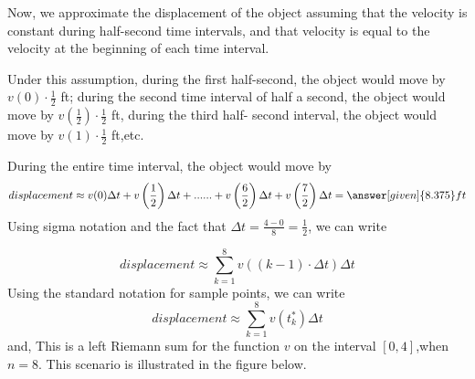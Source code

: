 \documentclass{ximera}
\begin{document}
\begin{example}
\begin{explanation}
\begin{image}
\end{image}
Now, we approximate the displacement of the object assuming that the velocity is constant during half-second time intervals, and that velocity is equal to the velocity at the beginning of each time interval.


 Under this assumption,  during the first half-second, the object would move by $v(0)\cdot\frac{1}{2}$ ft;  during the second time interval of half a  second, the object would move by $v\left(\frac{1}{2}\right)\cdot\frac{1}{2}$ ft, during the third half- second interval, the object would move by $v(1)\cdot\frac{1}{2}$ ft,etc. 
 
 
 During the entire time interval, the object would move by
\begin{align*}
   displacement \approx v(0)\Delta t+v\left(\frac{1}{2}\right)\Delta t+ ...... +v\left(\frac{6}{2}\right)\Delta t+v\left(\frac{7}{2}\right)\Delta t
   =\answer[given]{8.375} ft 
\end{align*}
Using sigma notation and the fact that $\Delta t=\frac{4-0}{8}=\frac{1}{2}$, we can write

  \[
   displacement\approx \sum_{k=1}^8v((k-1)\cdot\Delta t)\Delta t
\]
Using the standard notation for sample points, we can write
 \[
   displacement\approx \sum_{k=1}^8v(t_{k}^*)\Delta t
  \]
  and, 
  This is a left Riemann sum for the function $v$ on the interval $[0,4]$,when $n=8$.
This scenario is illustrated in the figure below.


\end{explanation}
\end{example}
\end{document}
